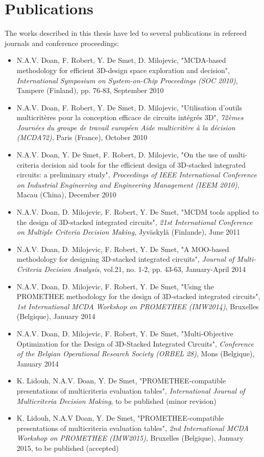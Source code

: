 \chapter*{Publications}

The works described in this thesis have led to several publications in refereed journals and conference proceedings:

\begin{itemize}
\item N.A.V. Doan, F. Robert, Y. De Smet, D. Milojevic, "MCDA-based methodology for efficient 3D-design space exploration and decision", \textit{International Symposium on System-on-Chip Proceedings (SOC 2010)}, Tampere (Finland), pp. 76-83, September 2010
\item N.A.V. Doan, F. Robert, Y. De Smet, D. Milojevic, "Utilisation d'outils multicritères pour la conception efficace de circuits intégrés 3D", \textit{72èmes Journées du groupe de travail européen Aide multicritère à la décision (MCDA72)}, Paris (France), October 2010
\item N.A.V. Doan, Y. De Smet, F. Robert, D. Milojevic, "On the use of multi-criteria decision aid tools for the efficient design of 3D-stacked integrated circuits: a preliminary study", \textit{Proceedings of IEEE International Conference on Industrial Engineering and Engineering Management (IEEM 2010)}, Macau (China), December 2010
\item N.A.V. Doan, D. Milojevic, F. Robert, Y. De Smet, "MCDM tools applied to the design of 3D-stacked integrated circuits", \textit{21st International Conference on Multiple Criteria Decision Making}, Jyväskylä (Finlande), June 2011
\item N.A.V. Doan, D. Milojevic, F. Robert, Y. De Smet, "A MOO-based methodology for designing 3D-stacked integrated circuits", \textit{Journal of Multi-Criteria Decision Analysis}, vol.21, no. 1-2, pp. 43-63, January-April 2014
\item N.A.V. Doan, D. Milojevic, F. Robert, Y. De Smet, "Using the PROMETHEE methodology for the design of 3D-stacked integrated circuits", \textit{1st International MCDA Workshop on PROMETHEE (IMW2014)}, Bruxelles (Belgique), January 2014
\item N.A.V. Doan, D. Milojevic, F. Robert, Y. De Smet, "Multi-Objective Optimization for the Design of 3D-Stacked Integrated Circuits", \textit{Conference of the Belgian Operational Research Society (ORBEL 28)}, Mons (Belgique), January 2014
\item K. Lidouh, N.A.V. Doan, Y. De Smet, "PROMETHEE-compatible presentations of multicriteria evaluation tables", \textit{International Journal of Multicriteria Decision Making}, to be published (minor revision)
\item K. Lidouh, N.A.V Doan, Y. De Smet, "PROMETHEE-compatible presentations of multicriteria evaluation tables", \textit{2nd International MCDA Workshop on PROMETHEE (IMW2015)}, Bruxelles (Belgique), January 2015, to be published (accepted)
\end{itemize}